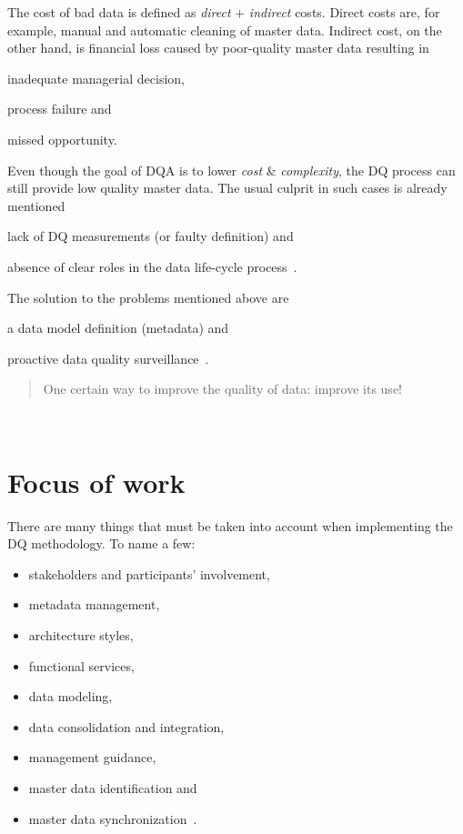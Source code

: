 The cost of bad data is defined as \textit{direct} + \textit{indirect} costs.
Direct costs are, for example, manual and automatic cleaning of master data.
Indirect cost, on the other hand, is financial loss caused by poor-quality master data resulting in
\begin{enumerate*}[label=(\roman*)]
    \item inadequate managerial decision,
    \item process failure and
    \item missed opportunity.
\end{enumerate*}

Even though the goal of DQA is to lower \textit{cost} \& \textit{complexity}, the DQ process can still provide low quality master data.
The usual culprit in such cases is already mentioned
\begin{enumerate*}[label=(\roman*)]
    \item lack of DQ measurements (or faulty definition) and
    \item absence of clear roles in the data life-cycle process~\cite{haug2013}.
\end{enumerate*}

The solution to the problems mentioned above are
\begin{enumerate*}[label=(\roman*)]
    \item a data model definition (metadata) and
    \item proactive data quality surveillance~\cite{risto2011}.
\end{enumerate*}

\blockquote[][]{One certain way to improve the quality of data: improve its use!}~\cite{orr1998}

\section*{Focus of work}

There are many things that must be taken into account when implementing the DQ methodology.
To name a few:

\begin{itemize}
    \item stakeholders and participants' involvement,
    \item metadata management,
    \item architecture styles,
    \item functional services,
    \item data modeling,
    \item data consolidation and integration,
    \item management guidance,
    \item master data identification and
    \item master data synchronization~\cite{loshin2008}.
\end{itemize}

